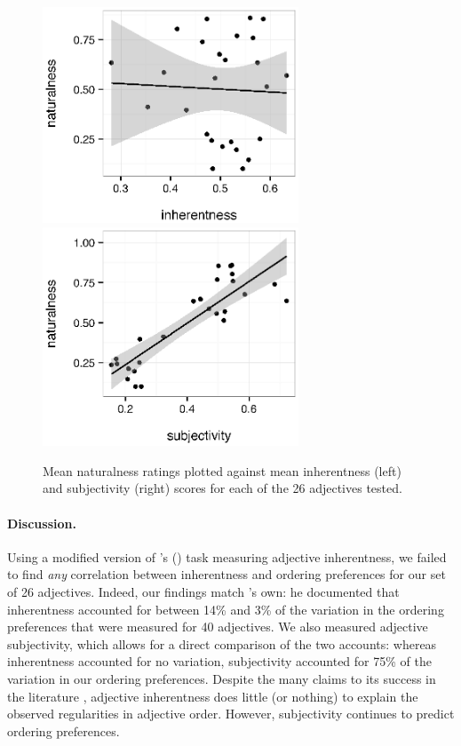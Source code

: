 \documentclass[12pt]{article}
\begin{document}
\renewcommand\thefigure{S.\arabic{figure}}
\begin{figure}
	\centering\includegraphics[width=3in]{plots/expt1-inherentness-naturalness.eps}\includegraphics[width=3in]{plots/expt1-subjectivity2-naturalness.eps}
	\caption{Mean naturalness ratings plotted against mean inherentness (left) and subjectivity (right) scores for each of the 26 adjectives tested.}\label{fig:inherentness}
\end{figure}

\paragraph{Discussion.} Using a modified version of \citeauthor{martin1969}'s (\citeyear{martin1969}) task measuring adjective inherentness, we failed to find \emph{any} correlation between inherentness and ordering preferences for our set of 26 adjectives. Indeed, our findings match \citeauthor{martin1969}'s own: he documented that inherentness accounted for between 14\% and 3\% of the variation in the ordering preferences that were measured for 40 adjectives. We also measured adjective subjectivity, which allows for a direct comparison of the two accounts: whereas inherentness accounted for no variation, subjectivity accounted for 75\% of the variation in our ordering preferences. Despite the many claims to its success in the literature \citep[e.g.,][]{sweet1898,whorf1945,kemmerer2000}, adjective inherentness does little (or nothing) to explain the observed regularities in adjective order. However, subjectivity continues to predict ordering preferences.
\end{document}

